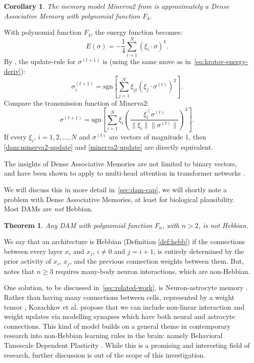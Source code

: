 \documentclass{article}
\newtheorem{theorem}{Theorem}[subsection]
\newtheorem{corollary}{Corollary}[subsection]
\theoremstyle{definition}
\begin{document}
\begin{corollary}
  The memory model \textsf{Minerva2} from
  \textcite{hintzman_minerva_1984} is approximately
  a Dense Associative Memory with polynomial function $F_4$.
\end{corollary}
\noindent
With polynomial function $F_4$, the energy function becomes:
\begin{equation}
  E(\sigma) = - \frac{1}{4} \sum^N_{i=1} (\xi_i \cdot \sigma)^4.
\end{equation}
By \textcite{krotov_modern_2025}, the update-rule for $\sigma^{(t+1)}$
is (using the same move as in~\autoref{eq:krotov-energy-deriv}):
\begin{equation}\label{dam:minerva2-update}
  \sigma^{(t+1)}_i = \text{sgn} \left[ \sum^N_{j=1} \xi_{ji} (\xi_j
  \cdot \sigma^{(t)})^3 \right].
\end{equation}
Compare the transmission function of \textsf{Minerva2}:
\begin{equation}\label{minerva2-update}
  \sigma^{(t+1)} = \text{sgn} \left[ \sum^N_{i=1} \xi_i
    \left(\frac{\xi_i^\top \sigma^{(t)}}{\|\xi_i\|
  \|\sigma^{(t)}\|}\right)^3 \right].
\end{equation}
If every $\xi_i$, $i=1, 2, \dots, N$ and $\sigma^{(t)}$ are vectors
of magnitude $1$,
then \autoref{dam:minerva2-update} and \autoref{minerva2-update}
are directly equivalent.

The insights of Dense Associative Memories are not limited to binary vectors,
and have been shown to apply to multi-head attention in transformer networks
\parencites{ramsauer_hopfield_2021,vaswani_attention_2023}.

We will discuss this in more detail in~\autoref{sec:dam-cap}, we will
shortly note a problem with Dense Associative Memories, at least for
biological plausibility. Most DAMs are \textit{not} Hebbian.
\begin{theorem}
  Any DAM with polynomial function $F_n$, with $n > 2$, is not Hebbian.
\end{theorem}
\noindent
We say that an architecture is Hebbian (Definition \ref{def:hebb}) if
the connections between
every layer $x_i$ and $x_j$, $i \neq 0$ and $j = i + 1$, is entirely
determined by the prior activity of $x_i$, $x_j$, and the
previous connection
weights between them. But, \textcite{krotov_large_2021} notes that
$n \geq 3$ requires many-body neuron interactions, which are non-Hebbian.

One solution, to be discussed in~\autoref{sec:related-work}, is Neuron-astrocyte
memory \parencite{kozachkov_neuron-astrocyte_2024}. Rather than having
many connections between cells, represented by a weight tensor
\parencites{kelly_memory_2017},
Kozachkov et al. propose that we can include non-linear interaction and weight
updates via modelling synapses which have both neural and astrocyte connections.
This kind of model builds on a general theme in contemporary research into
non-Hebbian learning rules in the brain: namely Behavioral Timescale Dependent
Plasticity \parencite{bittner_behavioral_2017}. While this is a promising
and interesting field of research, further discussion is out of the scope of
this investigation.
\end{document}
